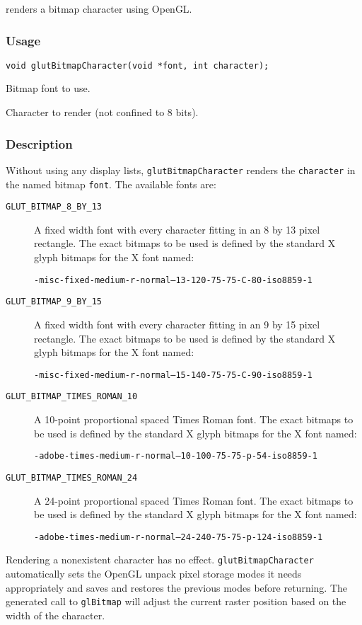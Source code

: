  renders a bitmap character using OpenGL.

\subsubsection*{Usage}
\begin{verbatim}
void glutBitmapCharacter(void *font, int character);
\end{verbatim}
\begin{description}
\itemsep 0in
\item[\tt font]
Bitmap font to use.
\item[\tt character]
Character to render (not confined to 8 bits).
\end{description}

\subsubsection*{Description}

Without using any display lists, {\tt glutBitmapCharacter} renders the {\tt character}
in the named bitmap {\tt font}.  The available fonts are:
\begin{description}
\item[{\tt GLUT\_BITMAP\_8\_BY\_13}]
A fixed width font with every character fitting in an 8 by 13 pixel
rectangle.  The exact bitmaps to be used is defined by the standard X glyph
bitmaps for the X font named:

{\tt -misc-fixed-medium-r-normal--13-120-75-75-C-80-iso8859-1}

\item[{\tt GLUT\_BITMAP\_9\_BY\_15}]
A fixed width font with every character fitting in an 9 by 15 pixel
rectangle.  The exact bitmaps to be used is defined by the standard X glyph
bitmaps for the X font named:

{\tt -misc-fixed-medium-r-normal--15-140-75-75-C-90-iso8859-1}

\item[{\tt GLUT\_BITMAP\_TIMES\_ROMAN\_10}]
A 10-point proportional spaced
Times Roman font.  The exact bitmaps to be used is defined by the
standard X glyph bitmaps for the X font named:

{\tt -adobe-times-medium-r-normal--10-100-75-75-p-54-iso8859-1}

\item[{\tt GLUT\_BITMAP\_TIMES\_ROMAN\_24}]
A 24-point proportional spaced
Times Roman font.  The exact bitmaps to be used is defined by the
standard X glyph bitmaps for the X font named:

{\tt -adobe-times-medium-r-normal--24-240-75-75-p-124-iso8859-1}

\end{description}
Rendering a nonexistent character has no effect.  {\tt glutBitmapCharacter} automatically
sets the OpenGL unpack pixel storage modes it needs appropriately and saves and restores
the previous modes before returning.  The generated call to {\tt glBitmap} will
adjust the current raster position based on the width of the character.

